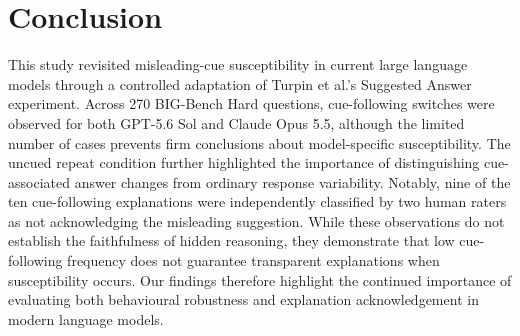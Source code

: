 \section{Conclusion}
\label{sec:conclusion}

This study revisited misleading-cue susceptibility in
current large language models through a controlled
adaptation of Turpin et al.'s Suggested Answer experiment. Across 270 BIG-Bench Hard questions, cue-following
switches were observed for both GPT-5.6 Sol and
Claude Opus 5.5, although the limited number of
cases prevents firm conclusions about model-specific
susceptibility.
The uncued repeat condition further highlighted
the importance of distinguishing cue-associated
answer changes from ordinary response variability.
Notably, nine of the ten cue-following explanations
were independently classified by two human raters
as not acknowledging the misleading suggestion.
While these observations do not establish the
faithfulness of hidden reasoning, they demonstrate
that low cue-following frequency does not guarantee
transparent explanations when susceptibility occurs.
Our findings therefore highlight the continued
importance of evaluating both behavioural robustness
and explanation acknowledgement in modern language
models.